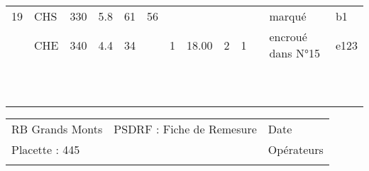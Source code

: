 \documentclass[a4paper, landscape]{article}\usepackage[]{graphicx}\usepackage[]{color}
\begin{document}
{\begin{tabular}{|p{1cm}|p{2cm}|p{1.6cm}|p{1.6cm}|p{1.6cm}|p{1.6cm}|p{1.5cm}|p{1.5cm}|p{1.5cm}|p{1.5cm}|p{1.5cm}|p{7.5cm}|p{5cm}|}
   \hline
19 & CHS & 330 & 5.8 & 61 & 56 &  &  &  &  &  & marqué & b1 \\ 
   \rowcolor[gray]{0.95} \hline
20 & CHE & 340 & 4.4 & 34 &  & 1 & 18.00 & 2 & 1 &  & encroué dans N°15 & e123 \\ 
   \hline
 &  &  &  &  &  &  &  &  &  &  &  &  \\ 
   \rowcolor[gray]{0.95} \hline
 &  &  &  &  &  &  &  &  &  &  &  &  \\ 
   \hline
 &  &  &  &  &  &  &  &  &  &  &  &  \\ 
   \rowcolor[gray]{0.95} \hline
 &  &  &  &  &  &  &  &  &  &  &  &  \\ 
   \hline
 &  &  &  &  &  &  &  &  &  &  &  &  \\ 
   \rowcolor[gray]{0.95} \hline
 &  &  &  &  &  &  &  &  &  &  &  &  \\ 
   \hline
 &  &  &  &  &  &  &  &  &  &  &  &  \\ 
   \rowcolor[gray]{0.95} \hline
 &  &  &  &  &  &  &  &  &  &  &  &  \\ 
   \hline
 &  &  &  &  &  &  &  &  &  &  &  &  \\ 
   \rowcolor[gray]{0.95} \hline
 &  &  &  &  &  &  &  &  &  &  &  &  \\ 
   \hline
\end{tabular}
}

\begin{tabular}{p{10cm}p{10cm}p{8cm}}
  RB Grands Monts & PSDRF : Fiche de Remesure & Date \\ 
  Placette : 445 &  & Opérateurs \\ 
   &  &  \\ 
  \end{tabular}
\end{document}
